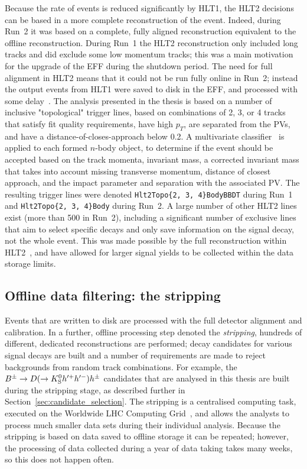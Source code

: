 Because the rate of events is reduced significantly by HLT1, the HLT2 decisions can be based in a more complete reconstruction of the event. Indeed, during Run~2 it was based on a complete, fully aligned reconstruction equivalent to the offline reconstruction. During Run~1 the HLT2 reconstruction only included long tracks and did exclude some low momentum tracks; this was a main motivation for the upgrade of the EFF during the shutdown period. The need for full alignment in HLT2 means that it could not be run fully online in Run~2; instead the output events from HLT1 were saved to disk in the EFF, and processed with some delay~\cite{Trigger-Performance2}. The analysis presented in the thesis is based on a number of inclusive "topological" trigger lines, based on combinations of 2, 3, or 4 tracks that satisfy fit quality requirements, have high $p_T$, are separated from the PVs, and have a distance-of-closes-approach below 0.2\mm. A multivariate classifier~\cite{gligorovEfficientReliableFast2013} is applied to each formed $n$-body object, to determine if the event should be accepted based on the track momenta, invariant mass, a corrected invariant mass that takes into account missing transverse momentum, distance of closest approach, and the impact parameter and separation with the associated PV. The resulting trigger lines were denoted \texttt{Hlt2Topo\{2, 3, 4\}BodyBBDT} during Run~1 and \texttt{Hlt2Topo\{2, 3, 4\}Body} during Run~2.  A large number of other HLT2 lines exist (more than 500 in Run~2), including a significant number of exclusive lines that aim to select specific decays and only save information on the signal decay, not the whole event. This was made possible by the full reconstruction within HLT2~\cite{Trigger-Performance2}, and have allowed for larger signal yields to be collected within the data storage limits.


\subsection{Offline data filtering: the \lhcb stripping} %
\label{sub:offline_data_filtering_the_lhcb_stripping}

Events that are written to disk are processed with the full detector alignment and calibration. In a further, offline processing step denoted the \emph{stripping}, hundreds of different, dedicated reconstructions are performed; decay candidates for various signal decays are built and a number of requirements are made to reject backgrounds from random track combinations. For example, the ${{B}^\pm}\rightarrow{\ensuremath{D}}(\rightarrow{\ensuremath{{K}^0_{\mathrm{S}}}} h'^+h'^-)h^\pm$ candidates that are analysed in this thesis are built during the stripping stage, as described further in Section~\ref{sec:candidate_selection}. The stripping is a centralised computing task, executed on the Worldwide LHC Computing Grid~\cite{birdComputingLargeHadron2011a}, and allows the analysts to process much smaller data sets during their individual analysis. Because the stripping is based on data saved to offline storage it can be repeated; however, the processing of data collected during a year of data taking takes many weeks, so this does not happen often.

